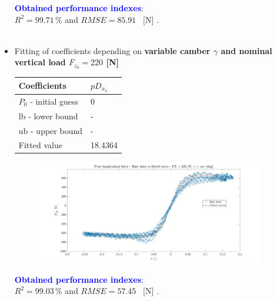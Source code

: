 \documentclass{IEEEtran}
\begin{document}
\begin{itemize}
\begin{figure}[!h]
                    \label{fig:variable load Fx0}
                \end{figure}
                \textbf{\textcolor{blue}{Obtained performance indexes}}: \\ $R^{2} = 99.71 \, \%$ and $RMSE = 85.91 $ \, [N] .\\\\
            \newpage
                
                               
            \item Fitting of coefficients depending on \textbf{variable camber $\gamma$ and nominal vertical load $F_{z_0} = 220$ [N]}
            \begin{table}[htbp]
                \begin{center}
                \begin{tabular}{|l|l|}
                \hline
                Coefficients       & $pD_{x_3}$    \\ \hline
                $P_0$ - initial guess & 0       \\ \hline
                lb - lower bound   & -       \\ \hline
                ub - upper bound   & -       \\ \hline
                Fitted value       & 18.4364 \\ \hline
                \end{tabular}
                \end{center}
            \end{table}
            
        
                \begin{figure}[htbp]
                    \centerline{\includegraphics[width = 3.95in]{pure_longitudinal_3.jpg}}
                   
                    \label{fig:variable camber Fx0}
                \end{figure}
            
            
          
            \textbf{\textcolor{blue}{Obtained performance indexes}}: \\ $R^{2} = 99.03 \, \%$ and $RMSE = 57.45 $ \, [N] . \\\\


\end{itemize}
\end{document}
